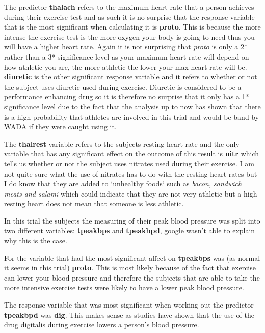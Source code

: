\documentclass[a4paper]{article}
\begin{document}
\newpage

The predictor \textbf{thalach} refers to the maximum heart rate that a person
achieves during their exercise test and as such it is no surprise that the
response variable that is the most significant when calculating it is
\textbf{proto}. This is because the more intense the exercise test is the more
oxygen your body is going to need thus you will have a higher heart rate. Again
it is not surprising that \textit{proto} is only a 2* rather than a 3*
significance level as your maximum heart rate will depend on how athletic you
are, the more athletic the lower your max heart rate will be. \textbf{diuretic}
is the other significant response variable and it refers to whether or not the
subject uses diuretic used during exercise. Diuretic is considered to be a
performance enhancing drug so it is therefore no surprise that it only has a 1*
significance level due to the fact that the analysis up to now has shown that
there is a high probability that athletes are involved in this trial and would
be band by WADA if they were caught using it.

\newpage

The \textbf{thalrest} variable refers to the subjects resting heart rate and the
only variable that has any significant effect on the outcome of this result is
\textbf{nitr} which tells us whether or not the subject uses nitrates used
during their exercise. I am not quite sure what the use of nitrates has to do
with the resting heart rates but I do know that they are added to `unhealthy
foods` such as \textit{bacon, sandwich meats and salami} which could indicate
that they are not very athletic but a high resting heart does not mean that
someone is less athletic.

\newpage
In this trial the subjects the measuring of their peak blood pressure was split
into two different variables: \textbf{tpeakbps} and \textbf{tpeakbpd}, google
wasn't able to explain why this is the case.

For the variable that had the most significant affect on \textbf{tpeakbps} was
(as normal it seems in this trial) \textbf{proto}. This is most likely because
of the fact that exercise can lower your blood pressure and therefore the
subjects that are able to take the more intensive exercise tests were likely to
have a lower peak blood pressure.

\newpage

The response variable that was most significant when working out the predictor
\textbf{tpeakbpd} was \textbf{dig}.  This makes sense as studies have shown that
the use of the drug digitalis during exercise lowers a person's blood pressure.
\end{document}
